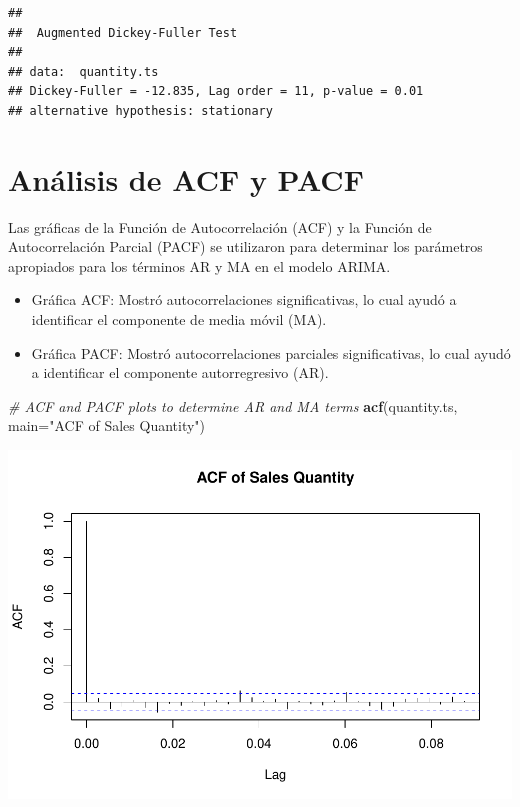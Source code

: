 \documentclass[
]{book}
\newenvironment{Shaded}{\begin{snugshade}}{\end{snugshade}}
\newcommand{\AttributeTok}[1]{\textcolor[rgb]{0.13,0.29,0.53}{#1}}
\newcommand{\CommentTok}[1]{\textcolor[rgb]{0.56,0.35,0.01}{\textit{#1}}}
\newcommand{\FunctionTok}[1]{\textcolor[rgb]{0.13,0.29,0.53}{\textbf{#1}}}
\newcommand{\NormalTok}[1]{#1}
\newcommand{\StringTok}[1]{\textcolor[rgb]{0.31,0.60,0.02}{#1}}
\begin{document}
\begin{verbatim}
## 
##  Augmented Dickey-Fuller Test
## 
## data:  quantity.ts
## Dickey-Fuller = -12.835, Lag order = 11, p-value = 0.01
## alternative hypothesis: stationary
\end{verbatim}

\section{Análisis de ACF y PACF}\label{anuxe1lisis-de-acf-y-pacf}

Las gráficas de la Función de Autocorrelación (ACF) y la Función de Autocorrelación Parcial (PACF) se utilizaron para determinar los parámetros apropiados para los términos AR y MA en el modelo ARIMA.

\begin{itemize}
\item
  Gráfica ACF: Mostró autocorrelaciones significativas, lo cual ayudó a identificar el componente de media móvil (MA).
\item
  Gráfica PACF: Mostró autocorrelaciones parciales significativas, lo cual ayudó a identificar el componente autorregresivo (AR).
\end{itemize}

\begin{Shaded}
\begin{Highlighting}[]
\CommentTok{\# ACF and PACF plots to determine AR and MA terms}
\FunctionTok{acf}\NormalTok{(quantity.ts, }\AttributeTok{main=}\StringTok{"ACF of Sales Quantity"}\NormalTok{)}
\end{Highlighting}
\end{Shaded}

\includegraphics{_main_files/figure-latex/unnamed-chunk-36-1.pdf}
\end{document}
